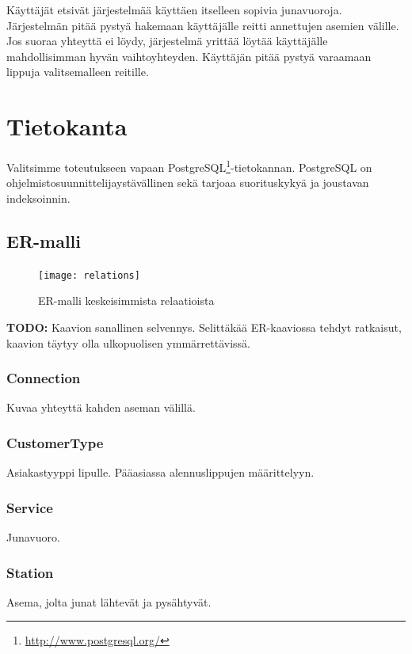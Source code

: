 \documentclass[a4paper,twoside,titlepage,12pt]{article}
\begin{document}
Käyttäjät etsivät järjestelmää käyttäen itselleen sopivia junavuoroja.
Järjestelmän pitää pystyä hakemaan käyttäjälle reitti annettujen asemien
välille. Jos suoraa yhteyttä ei löydy, järjestelmä yrittää löytää käyttäjälle
mahdollisimman hyvän vaihtoyhteyden. Käyttäjän pitää pystyä varaamaan lippuja
valitsemalleen reitille.

\section{Tietokanta}

Valitsimme toteutukseen vapaan PostgreSQL\footnote{\url{http://www.postgresql.org/}}-tietokannan. PostgreSQL on ohjelmistosuunnittelijaystävällinen sekä tarjoaa suorituskykyä ja joustavan indeksoinnin.

\subsection{ER-malli}

\begin{figure}
  \texttt{[image: relations]}
  \caption{ER-malli keskeisimmista relaatioista}
\end{figure}

\textbf{TODO:} Kaavion sanallinen selvennys. Selittäkää ER-kaaviossa tehdyt ratkaisut, kaavion täytyy olla ulkopuolisen ymmärrettävissä. 

\subsubsection{Connection}
Kuvaa yhteyttä kahden aseman välillä.

\subsubsection{CustomerType}

Asiakastyyppi lipulle.  Pääasiassa alennuslippujen
määrittelyyn.

\subsubsection{Service}

Junavuoro.

\subsubsection{Station}

Asema, jolta junat lähtevät ja pysähtyvät.
\end{document}
